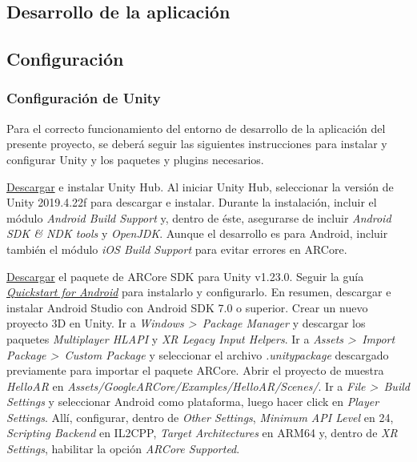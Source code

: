 \documentclass{article}
\newenvironment{standalone}{\begin{preview}}{\end{preview}}
\begin{document}
\begin{standalone}

\section{Desarrollo de la aplicación}

\subsection{Configuración}

\subsubsection{Configuración de Unity}

Para el correcto funcionamiento del entorno de desarrollo de la aplicación del presente proyecto, se deberá seguir las siguientes instrucciones para instalar y configurar Unity y los paquetes y plugins necesarios.

\href{https://unity3d.com/get-unity/download}{Descargar} e instalar Unity Hub.
Al iniciar Unity Hub, seleccionar la versión de Unity 2019.4.22f para descargar e instalar.
Durante la instalación, incluir el módulo \textit{Android Build Support} y, dentro de éste, asegurarse de incluir \textit{Android SDK \& NDK tools} y \textit{OpenJDK}.
Aunque el desarrollo es para Android, incluir también el módulo \textit{iOS Build Support} para evitar errores en ARCore.

\href{https://github.com/google-ar/arcore-unity-sdk/releases}{Descargar} el paquete de ARCore SDK para Unity v1.23.0.
Seguir la guía \href{https://developers.google.com/ar/develop/unity/quickstart-android?hl=en}{\textit{Quickstart for Android}} para instalarlo y configurarlo.
En resumen, descargar e instalar Android Studio con Android SDK 7.0 o superior.
Crear un nuevo proyecto 3D en Unity.
Ir a \textit{Windows >\ Package Manager} y descargar los paquetes \textit{Multiplayer HLAPI} y \textit{XR Legacy Input Helpers}.
Ir a \textit{Assets >\ Import Package >\ Custom Package} y seleccionar el archivo \textit{.unitypackage} descargado previamente para importar el paquete ARCore.
Abrir el proyecto de muestra \textit{HelloAR} en \textit{Assets/GoogleARCore/Examples/HelloAR/Scenes/}.
Ir a \textit{File >\ Build Settings} y seleccionar Android como plataforma, luego hacer click en \textit{Player Settings}. Allí, configurar, dentro de \textit{Other Settings}, \textit{Minimum API Level} en 24, \textit{Scripting Backend} en IL2CPP, \textit{Target Architectures} en ARM64 y, dentro de \textit{XR Settings}, habilitar la opción \textit{ARCore Supported}.


\end{standalone}
\end{document}
